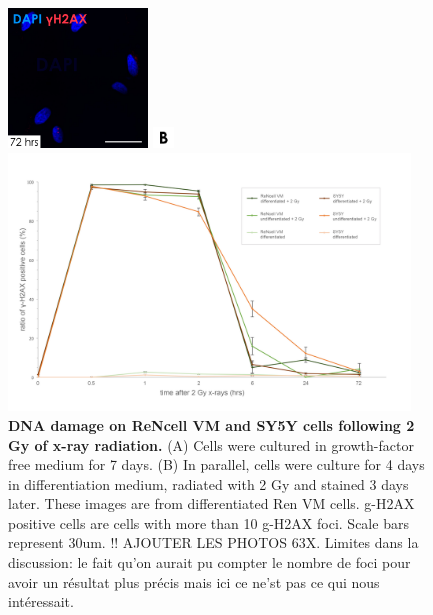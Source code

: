 \documentclass[onecolumn,10pt]{asme2ej}
\begin{document}
\begin{figure}[h]
	\includegraphics[width=0.33\textwidth]{figures/g-h2ax/72hr}
	
	\includegraphics[width=0.05\textwidth]{figures/b}
	
	
	
	\includegraphics[width=0.95\textwidth]{figures/g-h2ax}
	\caption{\textbf{DNA damage on ReNcell VM and SY5Y cells following 2 Gy of x-ray radiation.} (A) Cells were cultured in growth-factor free medium for 7 days. (B) In parallel, cells were culture for 4 days in differentiation medium, radiated with 2 Gy and stained 3 days later.
		These images are from differentiated Ren VM cells. 
		g-H2AX positive cells are cells with more than 10 g-H2AX foci. 
		Scale bars represent 30um. 
		!! AJOUTER LES PHOTOS 63X.
		Limites dans la discussion: le fait qu'on aurait pu compter le nombre de foci pour avoir un résultat plus précis mais ici ce ne'st pas ce qui nous intéressait.
	}
	\label{g_h2ax}
\end{figure}
\end{document}
